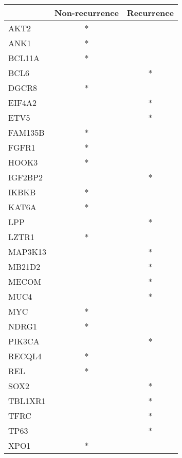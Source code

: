 \begin{tabular}{lcc}
\toprule
{} & Non-recurrence & Recurrence \\
\midrule
AKT2    &              * &            \\
ANK1    &              * &            \\
BCL11A  &              * &            \\
BCL6    &                &          * \\
DGCR8   &              * &            \\
EIF4A2  &                &          * \\
ETV5    &                &          * \\
FAM135B &              * &            \\
FGFR1   &              * &            \\
HOOK3   &              * &            \\
IGF2BP2 &                &          * \\
IKBKB   &              * &            \\
KAT6A   &              * &            \\
LPP     &                &          * \\
LZTR1   &              * &            \\
MAP3K13 &                &          * \\
MB21D2  &                &          * \\
MECOM   &                &          * \\
MUC4    &                &          * \\
MYC     &              * &            \\
NDRG1   &              * &            \\
PIK3CA  &                &          * \\
RECQL4  &              * &            \\
REL     &              * &            \\
SOX2    &                &          * \\
TBL1XR1 &                &          * \\
TFRC    &                &          * \\
TP63    &                &          * \\
XPO1    &              * &            \\
\bottomrule
\end{tabular}
